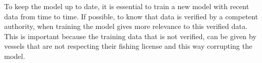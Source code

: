 To keep the model up to date, it is essential to train a new model with recent data from time to time. If possible, to know that data is verified by a competent authority, when training the model gives more relevance to this verified data. This is important because the training data that is not verified, can be given by vessels that are not respecting their fishing license and this way corrupting the model.








